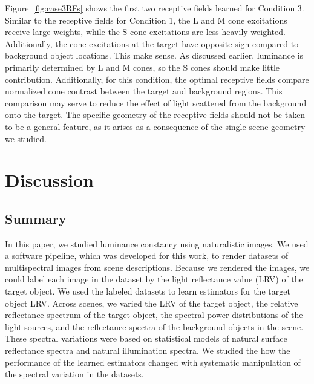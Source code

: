 \documentclass{jov}
\begin{document}
Figure~\ref{fig:case3RFs} shows the first two receptive fields learned for Condition 3.
Similar to the receptive fields for Condition 1, the L and M cone excitations receive large weights, while the S cone excitations are less heavily weighted. 
Additionally, the cone excitations at the target have opposite sign compared to background object locations.
This make sense.
As discussed earlier, luminance is primarily determined by L and M cones, so the S cones should make little
contribution.
Additionally, for this condition, the optimal receptive fields compare normalized cone contrast between the target and background regions. 
This comparison may serve to reduce the effect of light scattered from the background onto the target. 
The specific geometry of the receptive fields should not be taken to be a general feature, as it arises as a consequence
of the single scene geometry we studied.

\section{Discussion} \label{Discussion}

\subsection{Summary}

In this paper, we studied luminance constancy using naturalistic images.
We used a software pipeline, which was developed for this work, to render datasets of multispectral images from scene descriptions.
Because we rendered the images, we could label each image in the dataset by the light reflectance value (LRV) of the target object.
We used the labeled datasets to learn estimators for the target object LRV.
Across scenes, we varied the LRV of the target object, the relative reflectance spectrum of the target object, 
the spectral power distributions of the light sources, and the reflectance spectra of the background objects in the scene.
These spectral variations were based on statistical models of natural surface reflectance spectra and natural illumination spectra.
We studied the how the performance of the learned estimators changed with systematic manipulation of the spectral variation in the datasets.
\end{document}
